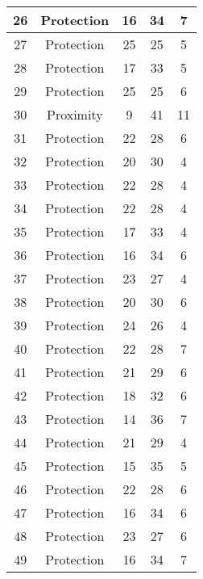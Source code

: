 \documentclass[results.tex]{subfiles}
\begin{document}
\begin{center}
\begin{tabular}{| c || c | c | c | c |}
    \hline
    26 & Protection & 16 & 34 & 7 \\ 
    \hline
    27 & Protection & 25 & 25 & 5 \\ 
    \hline
    28 & Protection & 17 & 33 & 5 \\ 
    \hline
    29 & Protection & 25 & 25 & 6 \\ 
    \hline
    30 & Proximity & 9 & 41 & 11 \\ 
    \hline
    31 & Protection & 22 & 28 & 6 \\ 
    \hline
    32 & Protection & 20 & 30 & 4 \\ 
    \hline
    33 & Protection & 22 & 28 & 4 \\ 
    \hline
    34 & Protection & 22 & 28 & 4 \\ 
    \hline
    35 & Protection & 17 & 33 & 4 \\ 
    \hline
    36 & Protection & 16 & 34 & 6 \\ 
    \hline
    37 & Protection & 23 & 27 & 4 \\ 
    \hline
    38 & Protection & 20 & 30 & 6 \\ 
    \hline
    39 & Protection & 24 & 26 & 4 \\ 
    \hline
    40 & Protection & 22 & 28 & 7 \\ 
    \hline
    41 & Protection & 21 & 29 & 6 \\ 
    \hline
    42 & Protection & 18 & 32 & 6 \\ 
    \hline
    43 & Protection & 14 & 36 & 7 \\ 
    \hline
    44 & Protection & 21 & 29 & 4 \\ 
    \hline
    45 & Protection & 15 & 35 & 5 \\ 
    \hline
    46 & Protection & 22 & 28 & 6 \\ 
    \hline
    47 & Protection & 16 & 34 & 6 \\ 
    \hline
    48 & Protection & 23 & 27 & 6 \\ 
    \hline
    49 & Protection & 16 & 34 & 7 \\ 
    \hline   \end{tabular}
\end{center}
\end{document}
